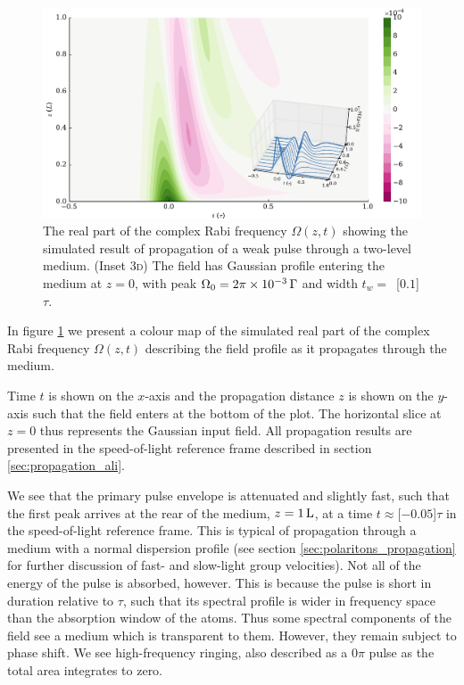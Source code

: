     \begin{figure}
      \includegraphics[width=\linewidth]{figs/02_propagation/mb_two_solve_wp_t01_Ng0100_T0_vel0_D0_fig1.pdf}
      \caption{
      The real part of the complex Rabi frequency $\Omega(z,t)$ showing the
      simulated result of propagation of a weak pulse through a two-level
      medium. (Inset \textsc{3d}) The field has Gaussian profile entering the
      medium at $z=0$, with peak $\Omega_0 = \unit[2\pi\times10^{-3}]{\Gamma}$
      and width $t_w =$~\unit[$0.1$]{$\tau$}.
      }
      \label{fig:pulse_field}
    \end{figure}

    In figure \ref{fig:pulse_field} we present a colour map of the simulated
    real part of the complex Rabi frequency $\Omega(z,t)$ describing the field
    profile as it propagates through the medium.

    Time $t$ is shown on the $x$-axis and the propagation distance $z$ is shown
    on the $y$-axis such that the field enters at the bottom of the plot. The
    horizontal slice at $z = 0$ thus represents the Gaussian input field. All
    propagation results are presented in the speed-of-light reference frame
    described in section \ref{sec:propagation_ali}.

    We see that the primary pulse envelope is attenuated and slightly fast, such
    that the first peak arrives at the rear of the medium, $z = \unit[1]{L}$, at
    a time $t \approx $\unit[$-0.05$]{$\tau$} in the speed-of-light reference
    frame. This is typical of propagation through a medium with a normal
    dispersion profile (see section \ref{sec:polaritons_propagation} for further
    discussion of fast- and slow-light group velocities). Not all of the energy
    of the pulse is absorbed, however. This is because the pulse is short in
    duration relative to $\tau$, such that its spectral profile is wider in
    frequency space than the absorption window of the atoms. Thus some spectral
    components of the field see a medium which is transparent to them. However,
    they remain subject to phase shift. We see high-frequency ringing, also
    described as a $0\pi$ pulse as the total area integrates to
    zero.\cite{allen1975optical, Durrant1976}

